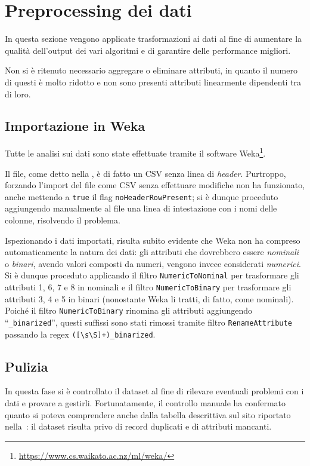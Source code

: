 \section{Preprocessing dei dati}

In questa sezione vengono applicate trasformazioni ai dati al fine di aumentare la qualità dell'output dei vari algoritmi e di garantire delle performance migliori.

Non si è ritenuto necessario aggregare o eliminare attributi, in quanto il numero di questi è molto ridotto e non sono presenti attributi linearmente dipendenti tra di loro.

\subsection{Importazione in Weka}

Tutte le analisi sui dati sono state effettuate tramite il software Weka\footnote{\url{https://www.cs.waikato.ac.nz/ml/weka/}}.

Il file, come detto nella , è di fatto un CSV senza linea di \emph{header}.
Purtroppo, forzando l'import del file come CSV senza effettuare modifiche non ha funzionato, anche mettendo a \texttt{true} il flag \texttt{noHeaderRowPresent};
si è dunque proceduto aggiungendo manualmente al file una linea di intestazione con i nomi delle colonne, risolvendo il problema.

Ispezionando i dati importati, risulta subito evidente che Weka non ha compreso automaticamente la natura dei dati:
gli attributi che dovrebbero essere \emph{nominali} o \emph{binari}, avendo valori composti da numeri, vengono invece considerati \emph{numerici}.
Si è dunque proceduto applicando il filtro \texttt{NumericToNominal} per trasformare gli attributi 1, 6, 7 e 8 in nominali
e il filtro \texttt{NumericToBinary} per trasformare gli attributi 3, 4 e 5 in binari (nonostante Weka li tratti, di fatto, come nominali).
Poiché il filtro \texttt{NumericToBinary} rinomina gli attributi aggiungendo ``\texttt{\_binarized}'',
questi suffissi sono stati rimossi tramite filtro \texttt{RenameAttribute} passando la regex \verb|([\s\S]+)_binarized|.

\subsection{Pulizia}

In questa fase si è controllato il dataset al fine di rilevare eventuali problemi con i dati e provare a gestirli.
Fortunatamente, il controllo manuale ha confermato quanto si poteva comprendere anche dalla tabella descrittiva sul sito riportato nella~:
il dataset risulta privo di record duplicati e di attributi mancanti.

